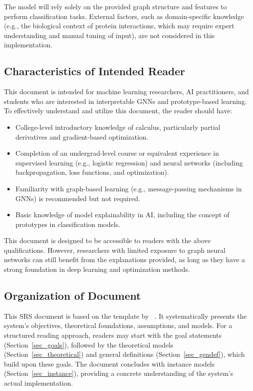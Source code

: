 \documentclass[12pt]{article}
\begin{document}
The model will rely solely on the provided graph structure and features to perform classification tasks. External factors, such as domain-specific knowledge (e.g., the biological context of protein interactions, which may require expert understanding and manual tuning of input), are not considered in this implementation.

\subsection{Characteristics of Intended Reader} \label{sec_IntendedReader}

This document is intended for machine learning researchers, AI practitioners, and students who are interested in interpretable GNNs and prototype-based learning. To effectively understand and utilize this document, the reader should have:
\begin{itemize}
    \item College-level introductory knowledge of calculus, particularly partial derivatives and gradient-based optimization.
    \item Completion of an undergrad-level course or equivalent experience in
supervised learning (e.g., logistic regression) and
neural networks (including backpropagation, loss functions, and optimization).
    \item Familiarity with graph-based learning (e.g., message-passing mechanisms in GNNs) is recommended but not required.
    \item Basic knowledge of model explainability in AI, including the concept of prototypes in classification models.
\end{itemize}

This document is designed to be accessible to readers with the above qualifications. However, researchers with limited exposure to graph neural networks can still benefit from the explanations provided, as long as they have a strong foundation in deep learning and optimization methods.

\subsection{Organization of Document}

This SRS document is based on the template by ~\citep{SmithAndLai2005, SmithEtAl2007}. It systematically presents the system's objectives, theoretical foundations, assumptions, and models. For a structured reading approach, readers may start with the goal statements (Section~\ref{sec_goals}), followed by the theoretical models (Section~\ref{sec_theoretical}) and general definitions (Section~\ref{sec_gendef}), which build upon these goals. The document concludes with instance models (Section~\ref{sec_instance}), providing a concrete understanding of the system’s actual implementation.
\end{document}
